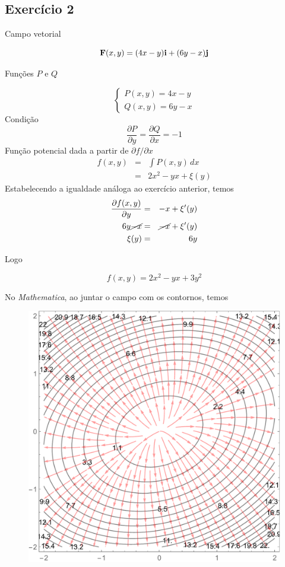 \documentclass[a4paper, 12pt, brazilian]{article}
\begin{document}
	\subsection{Exercício 2}
	
	Campo vetorial
	
	\begin{equation}
		\textbf{F} (x,y)=(4x-y)\textbf{i}+(6y-x)\textbf{j}
	\end{equation}
	
	Funções $P$ e $Q$
	
	$$
	\begin{cases}
		P(x,y)=4x-y\\
		Q(x,y)=6y-x
	\end{cases}
	$$
	Condição
	\begin{equation}
	\dfrac{\partial P}{\partial y}=\dfrac{\partial Q}{\partial x}=-1 
	\end{equation}
	Função potencial dada a partir de $\partial f/\partial x$
	\begin{eqnarray}
		f(x,y)&=&\int P(x,y)\,dx\\
		&=&2x^{2}-yx+\xi (y)
	\end{eqnarray}
	Estabelecendo a igualdade análoga ao exercício anterior, temos
	\begin{eqnarray}
		\dfrac{\partial f(x,y)}{\partial y}&=&-x+\xi'(y)\\
		6y\cancel{-x}&=&\cancel{-x}+\xi'(y)\\
		\xi(y)&=&6y
	\end{eqnarray}
	
	Logo
	
	\begin{equation}
		f(x,y)=2x^{2}-yx+3y^{2}
	\end{equation}
	
	No \textit{Mathematica}, ao juntar o campo com os contornos, temos
	
	\begin{figure}[H]
		\centering
		\includegraphics[width=0.7\linewidth]{images/g2}
		\label{fig:g2}
	\end{figure}
	
\end{document}
